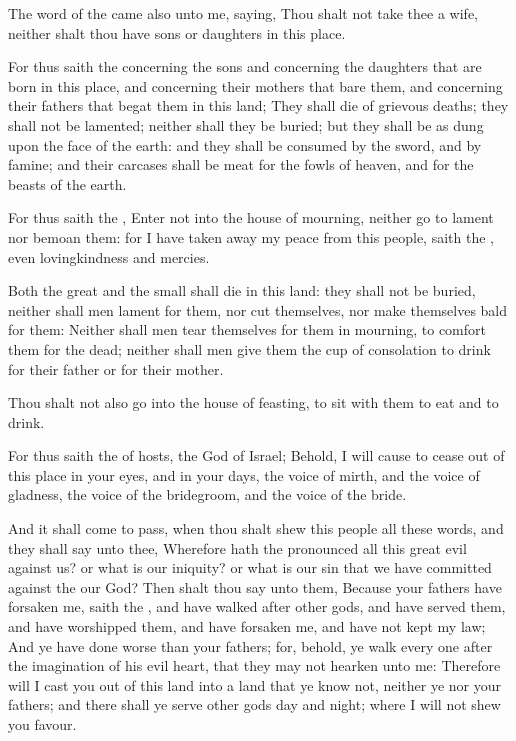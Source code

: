 \Chapter
\Verse The word of the \LORD came also unto me, saying, \Verse Thou shalt not take thee a wife, neither shalt thou have sons or daughters in this place.

\Verse For thus saith the \LORD concerning the sons and concerning the daughters that are born in this place, and concerning their mothers that bare them, and concerning their fathers that begat them in this land; \Verse They shall die of grievous deaths; they shall not be lamented; neither shall they be buried; but they shall be as dung upon the face of the earth: and they shall be consumed by the sword, and by famine; and their carcases shall be meat for the fowls of heaven, and for the beasts of the earth.

\Verse For thus saith the \LORD, Enter not into the house of mourning, neither go to lament nor bemoan them: for I have taken away my peace from this people, saith the \LORD, even lovingkindness and mercies.

\Verse Both the great and the small shall die in this land: they shall not be buried, neither shall men lament for them, nor cut themselves, nor make themselves bald for them: \Verse Neither shall men tear themselves for them in mourning, to comfort them for the dead; neither shall men give them the cup of consolation to drink for their father or for their mother.

\Verse Thou shalt not also go into the house of feasting, to sit with them to eat and to drink.

\Verse For thus saith the \LORD of hosts, the God of Israel; Behold, I will cause to cease out of this place in your eyes, and in your days, the voice of mirth, and the voice of gladness, the voice of the bridegroom, and the voice of the bride.

\Verse And it shall come to pass, when thou shalt shew this people all these words, and they shall say unto thee, Wherefore hath the \LORD pronounced all this great evil against us? or what is our iniquity? or what is our sin that we have committed against the \LORD our God?  \Verse Then shalt thou say unto them, Because your fathers have forsaken me, saith the \LORD, and have walked after other gods, and have served them, and have worshipped them, and have forsaken me, and have not kept my law; \Verse And ye have done worse than your fathers; for, behold, ye walk every one after the imagination of his evil heart, that they may not hearken unto me: \Verse Therefore will I cast you out of this land into a land that ye know not, neither ye nor your fathers; and there shall ye serve other gods day and night; where I will not shew you favour.

